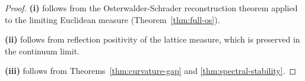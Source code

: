 \begin{proof}
\textbf{(i)} follows from the Osterwalder-Schrader reconstruction theorem applied 
to the limiting Euclidean measure (Theorem~\ref{thm:full-os}).

\textbf{(ii)} follows from reflection positivity of the lattice measure, which 
is preserved in the continuum limit.

\textbf{(iii)} follows from Theorems~\ref{thm:curvature-gap} and \ref{thm:spectral-stability}.
\end{proof}







